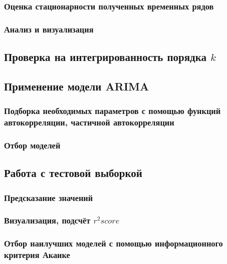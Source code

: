 \documentclass{article}
\begin{document}
    \subsubsection{Оценка стационарности полученных временных рядов}
    
    \subsubsection{Анализ и визуализация}
  
  \newpage
    
  \subsection{Проверка на интегрированность порядка $k$}
  
  \subsection{Применение модели ARIMA}
    
    \subsubsection{Подборка необходимых параметров с помощью функций автокорреляции, частичной автокорреляции}
    
    \subsubsection{Отбор моделей}
  
  \subsection{Работа с тестовой выборкой}
  
    \subsubsection{Предсказание значений}
    
    \subsubsection{Визуализация, подсчёт $r^2 score$}
    
    \subsubsection{Отбор наилучших моделей с помощью информационного критерия Акаике}
    
\end{document}
